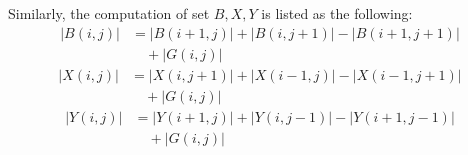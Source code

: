 \documentclass[10pt,journal,cspaper,compsoc]{IEEEtran}
\begin{document}
Similarly, the computation of set $B,X,Y$ is listed as the following:
\small
\begin{equation}
\begin{split}
|B(i,j)|  &= |B(i+1,j)| + |B(i,j+1)| - |B(i+1,j+1)| \\& \quad + |G(i,j)|
\end{split}
\end{equation}
\normalsize
\small
\begin{equation}
\begin{split}
|X(i,j)|  &= |X(i,j+1)| + |X(i-1,j)| - |X(i-1,j+1)| \\& \quad + |G(i,j)|
\end{split}
\end{equation}
\normalsize
\small
\begin{equation}
\begin{split}
|Y(i,j)|  &= |Y(i+1,j)| + |Y(i,j-1)| - |Y(i+1,j-1)| \\& \quad + |G(i,j)|
\end{split}
\end{equation}
\normalsize
\end{document}
